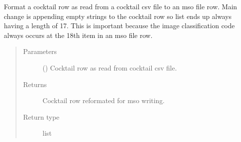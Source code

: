 \documentclass[letterpaper,10pt,english]{sphinxmanual}
\begin{document}
\begin{fulllineitems}
\begin{fulllineitems}
\begin{quote}
\begin{description}
\end{description}\end{quote}

\end{fulllineitems}


\begin{fulllineitems}
\label{\detokenize{polo.utils:polo.utils.io_utils.MsoWriter.mso_version}}
\end{fulllineitems}


\begin{fulllineitems}
\label{\detokenize{polo.utils:polo.utils.io_utils.MsoWriter.row_formater}}
Format a cocktail row as read from a cocktail csv
file to an mso file row. Main change is appending empty
strings to the cocktail row so list ends up always having
a length of 17. This is important because the image
classification code always occurs at the 18th item in
an mso file row.
\begin{quote}\begin{description}
\item[{Parameters}] \leavevmode
{} () \textendash{} Cocktail row as read from cocktail csv file.

\item[{Returns}] \leavevmode
Cocktail row reformated for mso writing.

\item[{Return type}] \leavevmode
list

\end{description}\end{quote}

\end{fulllineitems}



\end{fulllineitems}
\end{document}
